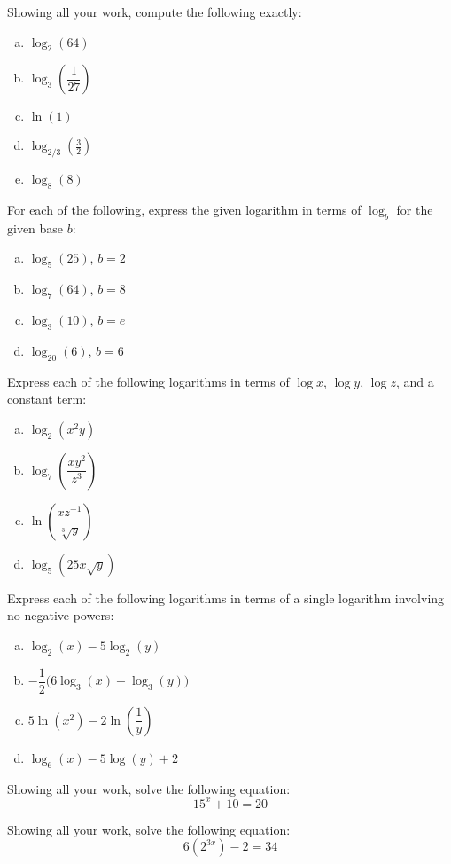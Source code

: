 \documentclass[11pt,letterpaper]{article}
\begin{document}
\newpage



 Showing all your work, compute the following exactly:
	\begin{enumerate}[(a)]
	\item $\log_2(64)$
	\item $\log_3 \left( \dfrac{1}{27} \right)$
	\item $\ln(1)$
	\item $\log_{2/3} \left( \frac{3}{2} \right)$
	\item $\log_8(8)$
	\end{enumerate}



\newpage



 For each of the following, express the given logarithm in terms of $\log_b$ for the given base $b$:
	\begin{enumerate}[(a)]
	\item $\log_5(25)$, $b= 2$
	\item $\log_7(64)$, $b= 8$
	\item $\log_3(10)$, $b= e$
	\item $\log_{20}(6)$, $b= 6$
	\end{enumerate}



\newpage



 Express each of the following logarithms in terms of $\log x$, $\log y$, $\log z$, and a constant term:
	\begin{enumerate}[(a)]
	\item $\log_2(x^2y)$
	\item $\log_7 \left(\dfrac{x y^2}{z^3} \right)$
	\item $\ln \left( \dfrac{x z^{-1}}{\sqrt[3]{y}} \right)$
	\item $\log_5(25 x \sqrt{y})$
	\end{enumerate}



\newpage



 Express each of the following logarithms in terms of a single logarithm involving no negative powers:
	\begin{enumerate}[(a)]
	\item $\log_2(x) - 5 \log_2(y)$
	\item $-\dfrac{1}{2} \big( 6 \log_3(x) - \log_3(y) \big)$
	\item $5\ln(x^2) - 2 \ln \left( \dfrac{1}{y} \right)$
	\item $\log_6(x) - 5 \log(y) + 2$
	\end{enumerate}



\newpage



 Showing all your work, solve the following equation: 
	\[
	15^x + 10= 20
	\]



\newpage



 Showing all your work, solve the following equation: 
	\[
	6(2^{3x}) - 2= 34
	\]
\end{document}
